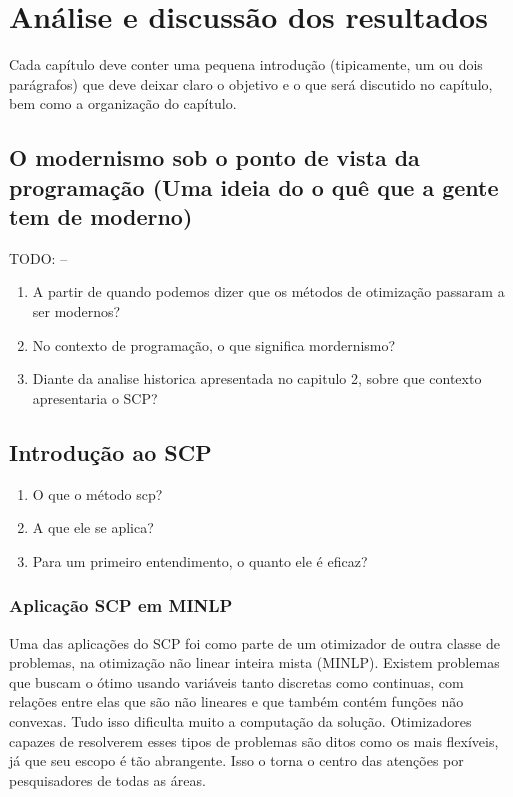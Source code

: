 
\chapter{\larger Análise e discussão dos resultados}

Cada capítulo deve conter uma pequena introdução (tipicamente, um ou dois parágrafos) que deve deixar claro o objetivo e o que será discutido no capítulo, bem como a organização do capítulo.



\section{O modernismo sob o ponto de vista da programação (Uma ideia do o quê que a gente tem de moderno)}
TODO: --
\begin{enumerate}
\item A partir de quando podemos dizer que os métodos de otimização passaram a ser modernos?
\item No contexto de programação, o que significa mordernismo?
\item Diante da analise historica apresentada no capitulo 2, sobre que contexto apresentaria o SCP?
\end{enumerate}






\section{Introdução ao SCP}

\begin{enumerate}
\item O que o método scp?
\item A que ele se aplica?
\item Para um primeiro entendimento, o quanto ele é eficaz?
\end{enumerate}

\subsection{Aplicação SCP em MINLP}
Uma das aplicações do SCP foi como parte de um otimizador de outra classe de problemas, na
otimização não linear inteira mista (MINLP). Existem problemas que buscam o ótimo usando
variáveis tanto discretas como continuas, com relações entre elas que são não lineares e
que também contém funções não convexas. Tudo isso dificulta muito a computação da solução.
Otimizadores capazes de resolverem esses tipos de problemas são ditos como os mais flexíveis,
já que seu escopo é tão abrangente. Isso o torna o centro das atenções por pesquisadores de
todas as áreas.

